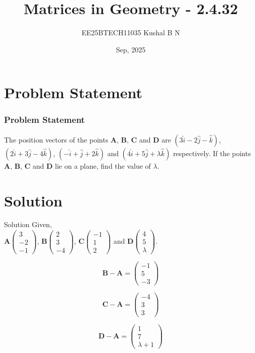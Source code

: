 \documentclass{beamer}
\title{Matrices in Geometry - 2.4.32}
\author{EE25BTECH11035  Kushal B N}
\date{Sep, 2025}
\let\vec\mathbf
\providecommand{\brak}[1]{\ensuremath{\left(#1\right)}}
\theoremstyle{remark}
\newcommand{\myvec}[1]{\ensuremath{\begin{pmatrix}#1\end{pmatrix}}}
\begin{document}
\maketitle

\section{Problem Statement}
\begin{frame}
\frametitle{Problem Statement}
The position vectors of the points $\vec{A}$, $\vec{B}$, $\vec{C}$ and $\vec{D}$ are $\brak{3\hat{i}-2\hat{j}-\hat{k}}$, $\brak{2\hat{i}+3\hat{j}-4\hat{k}}$, $\brak{-\hat{i}+\hat{j}+2\hat{k}}$ and $\brak{4\hat{i}+5\hat{j}+\lambda\hat{k}}$ respectively. If the points $\vec{A}$, $\vec{B}$, $\vec{C}$ and $\vec{D}$ lie on a plane, find the value of $\lambda$.

\end{frame}

\section{Solution}
\begin{frame}{Solution}
Given,\\
$\vec{A}\myvec{3\\-2\\-1}$, $\vec{B}\myvec{2\\3\\-4}$, $\vec{C}\myvec{-1\\1\\2}$ and $\vec{D}\myvec{4\\5\\\lambda}$.

\begin{equation}
\vec{B} - \vec{A} = \myvec{-1\\5\\-3}
\end{equation}

\begin{equation}
\vec{C} - \vec{A} = \myvec{-4\\3\\3}
\end{equation}

\begin{equation}
\vec{D} - \vec{A} = \myvec{1\\7\\\lambda+1}
\end{equation}

\end{frame}
\end{document}
